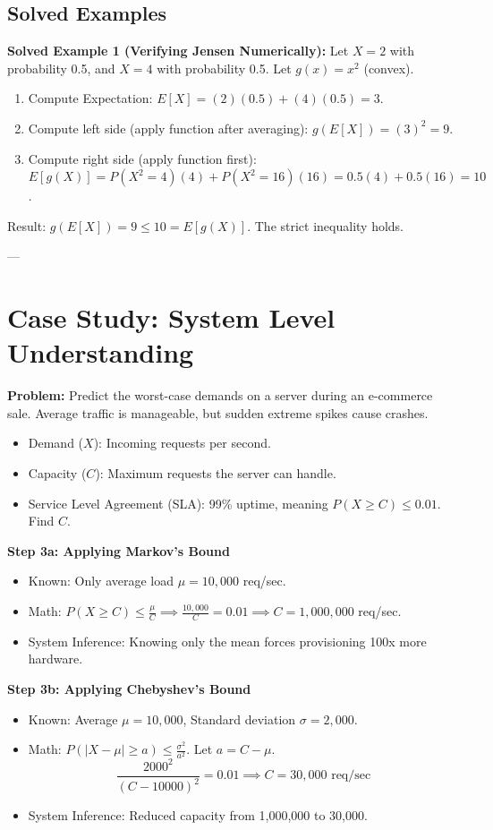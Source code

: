 \documentclass[11pt]{article}
\begin{document}
\subsection{Solved Examples}
\textbf{Solved Example 1 (Verifying Jensen Numerically):}
Let $X = 2$ with probability 0.5, and $X = 4$ with probability 0.5. Let $g(x) = x^2$ (convex).
\begin{enumerate}
    \item Compute Expectation: $E[X] = (2)(0.5) + (4)(0.5) = 3$.
    \item Compute left side (apply function after averaging): $g(E[X]) = (3)^2 = 9$.
    \item Compute right side (apply function first): $E[g(X)] = P(X^2=4)(4) + P(X^2=16)(16) = 0.5(4) + 0.5(16) = 10$.
\end{enumerate}
Result: $g(E[X]) = 9 \le 10 = E[g(X)]$. The strict inequality holds.

---

\section{Case Study: System Level Understanding}

\textbf{Problem:} Predict the worst-case demands on a server during an e-commerce sale. Average traffic is manageable, but sudden extreme spikes cause crashes.
\begin{itemize}
    \item Demand ($X$): Incoming requests per second.
    \item Capacity ($C$): Maximum requests the server can handle.
    \item Service Level Agreement (SLA): 99\% uptime, meaning $P(X \ge C) \le 0.01$. Find $C$.
\end{itemize}

\textbf{Step 3a: Applying Markov's Bound}
\begin{itemize}
    \item Known: Only average load $\mu = 10,000$ req/sec.
    \item Math: $P(X \ge C) \le \frac{\mu}{C} \implies \frac{10,000}{C} = 0.01 \implies C = 1,000,000$ req/sec.
    \item System Inference: Knowing only the mean forces provisioning 100x more hardware.
\end{itemize}

\textbf{Step 3b: Applying Chebyshev's Bound}
\begin{itemize}
    \item Known: Average $\mu = 10,000$, Standard deviation $\sigma = 2,000$.
    \item Math: $P(|X - \mu| \ge a) \le \frac{\sigma^2}{a^2}$. Let $a = C - \mu$.
    \[ \frac{2000^2}{(C - 10000)^2} = 0.01 \implies C = 30,000 \text{ req/sec} \]
    \item System Inference: Reduced capacity from 1,000,000 to 30,000.
\end{itemize}
\end{document}
